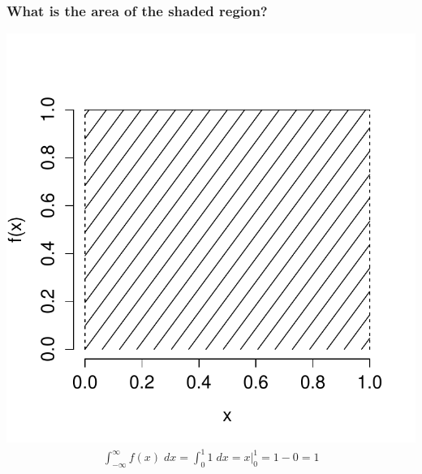 \documentclass[handout]{beamer}
\begin{document}

\begin{frame}
\frametitle{What is the area of the shaded region?}

\centering
	\includegraphics[scale = 0.4]{./images/uniform_density_shaded}
\begin{eqnarray*}
	\int_{-\infty}^{\infty} f(x) \; dx = \int_{0}^1 1 \; dx = \left. x \right|_0^1 = 1 - 0 = 1
\end{eqnarray*}
\end{frame}


\end{document}
